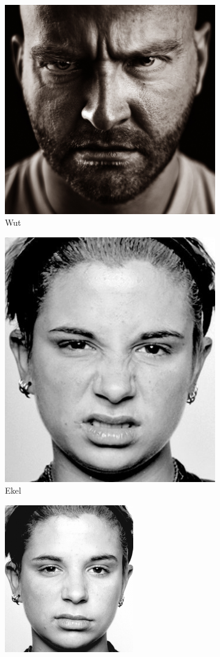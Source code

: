 \begin{figure}[htb]
	\begin{subfigure}[b]{.30\linewidth}
		\centering
		\includegraphics[width=0.5\linewidth]{images/mikroexpression-wut.jpg}
		\caption{Wut}
		\label{fig:socialengineering:weiteretechniken:mikroexpressionen:wut}
	\end{subfigure}%
	\begin{subfigure}[b]{.30\linewidth}
	  \centering
	  \includegraphics[width=0.5\linewidth]{images/mikroexpression-ekel.jpg}
	  \caption{Ekel}
	  \label{fig:socialengineering:weiteretechniken:mikroexpressionen:          ekel}
	\end{subfigure}
	\begin{subfigure}[b]{.30\linewidth}
		\centering
		\includegraphics[width=0.5\linewidth]{images/mikroexpression-verachtung.png}

\end{subfigure}
\end{figure}
